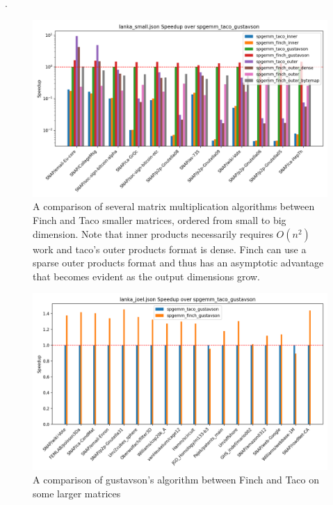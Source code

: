 .
\begin{figure}
	\includegraphics[width=\linewidth]{spgemm_small_speedup_log_scale.png}
    \caption{A comparison of several matrix multiplication algorithms between Finch and Taco smaller matrices, ordered from small to big dimension. Note that inner products necessarily requires $O(n^2)$ work and taco's outer products format is dense. Finch can use a sparse outer products format and thus has an asymptotic advantage that becomes evident as the output dimensions grow.}
\end{figure}

\begin{figure}
	\includegraphics[width=\linewidth]{spgemm_joel_speedup.png}
    \caption{A comparison of gustavson's algorithm between Finch and Taco on some larger matrices}
\end{figure}

